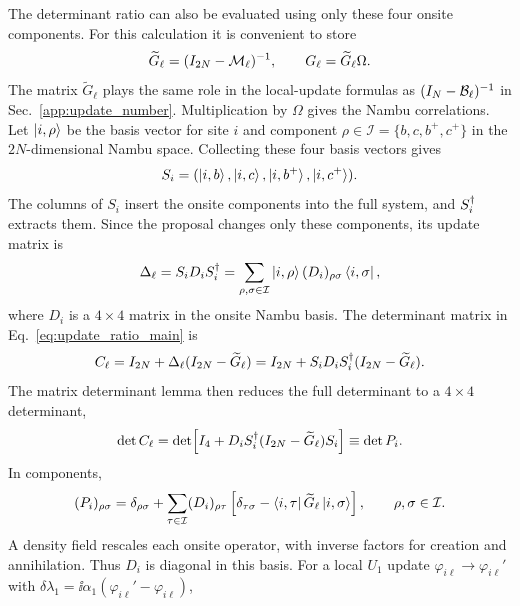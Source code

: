 The determinant ratio can also be evaluated using only these four onsite components. For this calculation it is convenient to store
\begin{equation}
    \widetilde G_\ell=(I_{2N}-\mathcal{M}_\ell)^{-1},
    \qquad G_\ell=\widetilde G_\ell\Omega.
\end{equation}
The matrix $\widetilde G_\ell$ plays the same role in the local-update formulas as $(I_N-\mathcal{B}_\ell)^{-1}$ in Sec.~\ref{app:update_number}. Multiplication by $\Omega$ gives the Nambu correlations. Let $\ket{i,\rho}$ be the basis vector for site $i$ and component $\rho\in\mathcal I=\{b,c,b^+,c^+\}$ in the $2N$-dimensional Nambu space. Collecting these four basis vectors gives
\begin{equation}
    S_i=(\ket{i,b},\ket{i,c},\ket{i,b^+},\ket{i,c^+}).
\end{equation}
The columns of $S_i$ insert the onsite components into the full system, and $S_i^\dagger$ extracts them. Since the proposal changes only these components, its update matrix is
\begin{equation}
    \Delta_\ell=S_iD_iS_i^\dagger
    =\sum_{\rho,\sigma\in\mathcal I}\ket{i,\rho}(D_i)_{\rho\sigma}\bra{i,\sigma},
\end{equation}
where $D_i$ is a $4\times4$ matrix in the onsite Nambu basis. The determinant matrix in Eq.~\eqref{eq:update_ratio_main} is
\begin{equation}
    C_\ell=I_{2N}+\Delta_\ell(I_{2N}-\widetilde G_\ell)
    =
    I_{2N}+S_iD_i S_i^\dagger(I_{2N}-\widetilde G_\ell).
\end{equation}
The matrix determinant lemma then reduces the full determinant to a $4\times4$ determinant,
\begin{equation}
    \det C_\ell
    =
    \det\!\left[
    I_4+D_i S_i^\dagger(I_{2N}-\widetilde G_\ell)S_i
    \right]
    \equiv \det P_i.
    \label{eq:paired_local_det_lemma}
\end{equation}
In components,
\begin{equation}
    (P_i)_{\rho\sigma}
    =
    \delta_{\rho\sigma}
    +\sum_{\tau\in\mathcal I}
    (D_i)_{\rho\tau}
    \left[
    \delta_{\tau\sigma}
    -\bra{i,\tau}\widetilde G_\ell\ket{i,\sigma}
    \right],
    \qquad
    \rho,\sigma\in\mathcal I.
    \label{eq:paired_local_block}
\end{equation}
A density field rescales each onsite operator, with inverse factors for creation and annihilation. Thus $D_i$ is diagonal in this basis. For a local $U_1$ update $\varphi_{i\ell}\to\varphi_{i\ell}'$ with $\delta\lambda_1=\ii\alpha_1(\varphi_{i\ell}'-\varphi_{i\ell})$,
